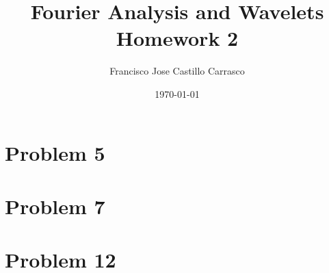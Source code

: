 




\title{Fourier Analysis and Wavelets\\Homework 2}
\author{Francisco Jose Castillo Carrasco}
\date{\today}
\maketitle




\section*{Problem 5}


\section*{Problem 7}


\section*{Problem 12}



